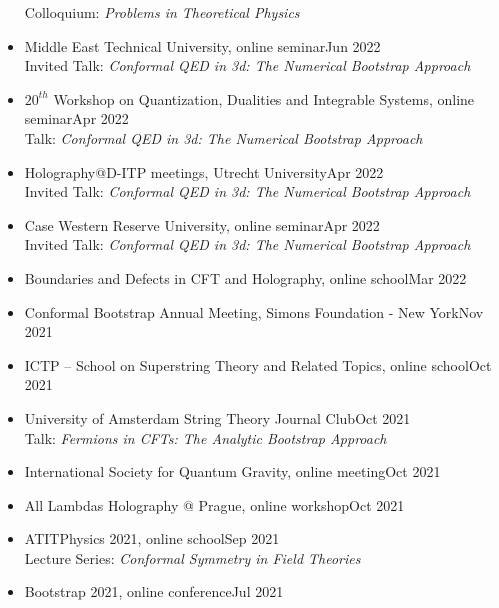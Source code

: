 \documentclass[a4paper,11pt]{article}
\begin{document}
\begin{itemize}[itemsep=.001em]
\hspace*{1.8em}Colloquium: \emph{Problems in Theoretical Physics}
	\item[] Middle East Technical University, online seminar\hfill Jun 2022
\\
\hspace*{1.8em}Invited Talk: \emph{Conformal QED in 3d: The Numerical Bootstrap Approach}
	\item[] $20^{th}$ Workshop on
	Quantization, Dualities and Integrable Systems, online seminar\hfill Apr 2022
\\
\hspace*{1.8em}Talk: \emph{Conformal QED in 3d: The Numerical Bootstrap Approach}
	\item[] Holography@D-ITP meetings, Utrecht University\hfill Apr 2022
	\\
	\hspace*{1.8em}Invited Talk: \emph{Conformal QED in 3d: The Numerical Bootstrap Approach}
	\item[] Case Western Reserve University, online seminar\hfill Apr 2022
	\\
	\hspace*{1.8em}Invited Talk: \emph{Conformal QED in 3d: The Numerical Bootstrap Approach}
	\item[] Boundaries and Defects in CFT and Holography, online school\hfill Mar 2022
	\\
	\item[] Conformal Bootstrap Annual Meeting, Simons Foundation - New York\hfill Nov 2021
	\item[] ICTP -- School on Superstring Theory and Related Topics, online school\hfill Oct 2021
	\\
	\item[] University of Amsterdam String Theory Journal Club\hfill Oct 2021
	\\
	\hspace*{1.8em}Talk: \emph{Fermions in CFTs: The Analytic Bootstrap Approach}
	\item[] International Society for Quantum Gravity, online meeting\hfill Oct 2021
	\item[] All Lambdas Holography @ Prague, online workshop\hfill Oct 2021
	\item[] ATITPhysics 2021, online school\hfill Sep 2021\\
	\hspace*{1.8em}Lecture Series: \emph{Conformal Symmetry in Field Theories}
	\item[] Bootstrap 2021, online conference\hfill Jul 2021

\end{itemize}
\end{document}
